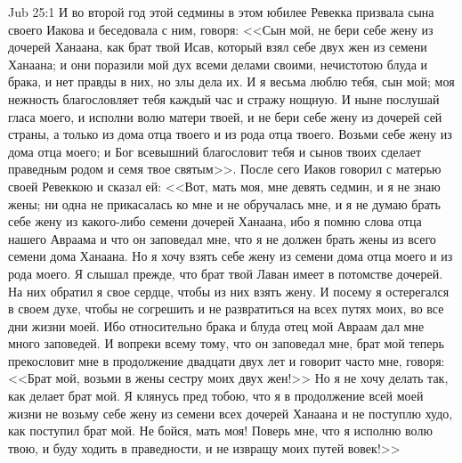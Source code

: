 \vs Jub 25:1
И во второй год этой седмины в этом юбилее
Ревекка призвала сына своего Иакова и беседовала
с ним, говоря: <<Сын мой, не бери себе жену из
дочерей Ханаана, как брат твой Исав, который взял
себе двух жен из семени Ханаана; и они поразили
мой дух всеми делами своими, нечистотою блуда и
брака, и нет правды в них, но злы дела их. И я
весьма люблю тебя, сын мой; моя нежность
благословляет тебя каждый час и стражу нощную. И
ныне послушай гласа моего, и исполни волю матери
твоей, и не бери себе жену из дочерей сей страны, а
только из дома отца твоего и из рода отца твоего.
Возьми себе жену из дома отца моего; и Бог
всевышний благословит тебя и сынов твоих сделает
праведным родом и семя твое святым>>. После сего
Иаков говорил с матерью своей Ревеккою и сказал
ей: <<Вот, мать моя, мне девять седмин, и я не знаю
жены; ни одна не прикасалась ко мне и не
обручалась мне, и я не думаю брать себе жену из
какого-либо семени дочерей Ханаана, ибо я помню
слова отца нашего Авраама и что он заповедал мне,
что я не должен брать жены из всего семени дома
Ханаана. Но я хочу взять себе жену из семени дома
отца моего и из рода моего. Я слышал прежде, что
брат твой Лаван имеет в потомстве дочерей. На них
обратил я свое сердце, чтобы из них взять жену. И
посему я остерегался в своем духе, чтобы не
согрешить и не развратиться на всех путях моих,
во все дни жизни моей. Ибо относительно брака и
блуда отец мой Авраам дал мне много заповедей. И
вопреки всему тому, что он заповедал мне, брат мой
теперь прекословит мне в продолжение двадцати
двух лет и говорит часто мне, говоря: <<Брат мой,
возьми в жены сестру моих двух жен!>> Но я не
хочу делать так, как делает брат мой. Я клянусь
пред тобою, что я в продолжение всей моей жизни не
возьму себе жену из семени всех дочерей Ханаана и
не поступлю худо, как поступил брат мой. Не бойся,
мать моя! Поверь мне, что я исполню волю твою, и
буду ходить в праведности, и не извращу моих
путей вовек!>>

